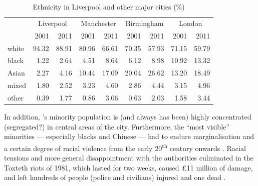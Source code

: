 	\begin{table}[h]
		\centering
		\caption{Ethnicity in Liverpool and other major cities (\%)}
		\begin{tabular}{lrrrrrrrr}
			\hline
	 		& \multicolumn{2}{c}{Liverpool} & \multicolumn{2}{c}{Manchester} & \multicolumn{2}{c}{Birmingham} & \multicolumn{2}{c}{London} \\
			 & 2001 & 2011 & 2001 & 2011 & 2001 & 2011 & 2001 & 2011 \\
			 \hline
			 white & 94.32 & 88.91 & 80.96 & 66.61 & 70.35 & 57.93 & 71.15 & 59.79 \\
			 black & 1.22 & 2.64 & 4.51 & 8.64 & 6.12 & 8.98 & 10.92 & 13.32 \\
	 		 Asian & 2.27 & 4.16 & 10.44 & 17.09 & 20.04 & 26.62 & 13.20 & 18.49 \\
	 		 mixed & 1.80 & 2.52 & 3.23 & 4.60 & 2.86 & 4.44 & 3.15 & 4.96 \\
	 		 other & 0.39 & 1.77 & 0.86 & 3.06 & 0.63 & 2.03 & 1.58 & 3.44 \\
	 		 \hline
		\end{tabular}
		\label{tab.ethnicity}
	\end{table}

In addition, 's minority population is (and always has been) highly concentrated (segregated?) in central areas of the city.
Furthermore, the ``most visible'' minorities --- especially blacks and Chinese --- had to endure marginalisation and a certain degree of racial violence from the early 20\textsuperscript{th} century onwards \citep[cf.][189--191]{pooley2006}.
Racial tensions and more general disappointment with the authorities culminated in the Toxteth riots of 1981, which lasted for two weeks, caused \pounds11 million of damage, and left hundreds of people (police and civilians) injured and one dead \citep[cf][440--444]{murden2006}.

